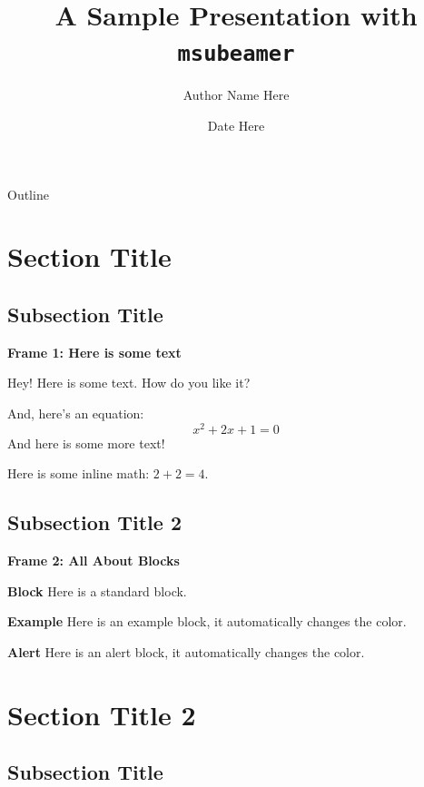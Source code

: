 \documentclass[aspectratio=169]{beamer}
\title[Sample Presentation]{\bfseries A Sample Presentation with {\tt msubeamer}}
\author{Author Name Here}
\institute{Department Info Here} %
\date{Date Here}
\begin{document}
\maketitleframe

\begin{frame}{Outline}
\label{outline}
    \tableofcontents
    \hyperlink{back}{}
\end{frame}

\section{Section Title}
\subsection{Subsection Title}

\begin{frame}{\bfseries Frame 1: Here is some text}

Hey!  Here is some text.  How do you like it?

And, here's an equation:
\[
x^{2} + 2x + 1 = 0
\]
And here is some more text!

Here is some inline math: $2+2=4$.

\end{frame}

\subsection{Subsection Title 2}
\begin{frame}{\bfseries Frame 2: All About Blocks}

\begin{block}{\bfseries Block}
Here is a standard block. 
\end{block}

\begin{exampleblock}{\bfseries Example}
Here is an example block, it automatically changes the color. 
\end{exampleblock}

\begin{alertblock}{\bfseries Alert}
Here is an alert block, it automatically changes the color. 
\end{alertblock}
\end{frame}


\section{Section Title 2}
\subsection{Subsection Title}
\end{document}
